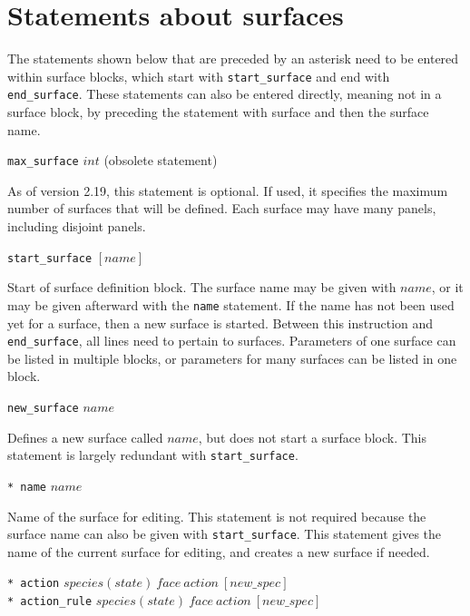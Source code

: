 \documentclass {scrbook}
\newcommand {\ttt} {\texttt}
\begin{document}
\section{Statements about surfaces}

The statements shown below that are preceded by an asterisk need to be entered within surface blocks, which start with \ttt{start\_surface} and end with \ttt{end\_surface}. These statements can also be entered directly, meaning not in a surface block, by preceding the statement with surface and then the surface name.

\begin{description}

\item{\ttt{max\_surface} $int$ (obsolete statement)}

As of version 2.19, this statement is optional. If used, it specifies the maximum number of surfaces that will be defined. Each surface may have many panels, including disjoint panels.

\item{\ttt{start\_surface} $[name]$}

Start of surface definition block. The surface name may be given with $name$, or it may be given afterward with the \ttt{name} statement. If the name has not been used yet for a surface, then a new surface is started. Between this instruction and \ttt{end\_surface}, all lines need to pertain to surfaces. Parameters of one surface can be listed in multiple blocks, or parameters for many surfaces can be listed in one block.

\item{\ttt{new\_surface} $name$}

Defines a new surface called $name$, but does not start a surface block. This statement is largely redundant with \ttt{start\_surface}.

\item{\ttt{* name} $name$}

Name of the surface for editing. This statement is not required because the surface name can also be given with \ttt{start\_surface}. This statement gives the name of the current surface for editing, and creates a new surface if needed.

\item{\ttt{* action} $species(state)\ face\ action\ [new\_spec]$\\
\ttt{* action\_rule} $species(state)\ face\ action\ [new\_spec]$}


\end{description}
\end{document}

